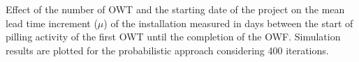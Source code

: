 \label{fig:seasonaleffect}
Effect of the number of OWT and the starting date of the project on the mean lead time increment ($\mu$) of the installation measured in days between the start of pilling activity of the first OWT until the completion of the OWF. Simulation results are plotted for the probabilistic approach considering 400 iterations.